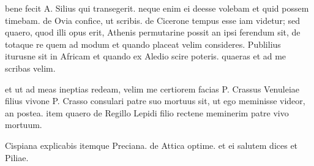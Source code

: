 


 bene fecit A. Silius qui transegerit. neque enim ei deesse volebam et quid possem timebam. de Ovia confice, ut scribis. de Cicerone tempus esse iam videtur; sed quaero, quod illi opus erit, Athenis permutarine possit an ipsi ferendum sit, de totaque re quem ad modum et quando placeat velim consideres. Publilius iturusne sit in Africam et quando ex Aledio scire poteris. quaeras et ad me scribas velim.

 et ut ad meas ineptias redeam, velim me certiorem facias P. Crassus Venuleiae filius vivone P. Crasso consulari patre suo mortuus sit, ut ego meminisse videor, an postea. item quaero de Regillo Lepidi filio rectene meminerim patre vivo mortuum.

 Cispiana explicabis itemque Preciana. de Attica optime. et ei salutem dices et Piliae.
